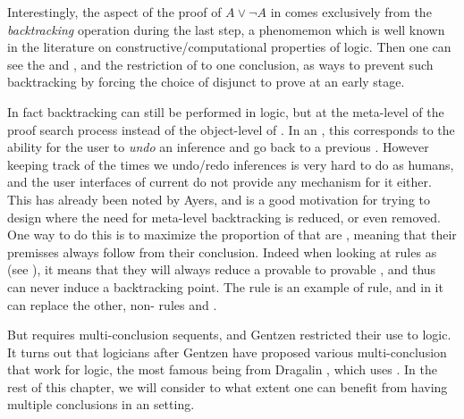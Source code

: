 Interestingly, the  aspect of the proof of $A \lor \neg A$ in
 comes exclusively from the \emph{backtracking} operation during
the last step, a phenomemon which is well known in the literature on
constructive/computational properties of  logic.
Then one can see the  {} and {},
and the restriction of   to one conclusion, as ways to
prevent such backtracking by forcing the choice of disjunct to prove at an early
stage.

In fact backtracking can still be performed in  logic, but at the
meta-level of the proof search process instead of the object-level of . In an , this corresponds to the ability for the
user to \emph{undo} an inference and go back to a previous . However
keeping track of the times we undo/redo inferences is very hard to do as humans,
and the user interfaces of current  do not provide any mechanism
for it either. This has already been noted by Ayers, and is a good motivation for trying to design
 where the need for meta-level backtracking is reduced, or even
removed. One way to do this is to maximize the proportion of 
that are \emph{}, meaning that their premisses always follow from
their conclusion. Indeed when looking at rules as  (see ),
it means that they will always reduce a provable  to provable , and
thus can never induce a backtracking point. The {} rule is an example of
 rule, and in  it can replace the other, non- rules
{} and {}.

But {} requires multi-conclusion sequents, and Gentzen restricted
their use to  logic. It turns out that logicians after Gentzen have
proposed various multi-conclusion  that work for 
logic, the most famous being  from Dragalin
, which uses {}. In the rest of
this chapter, we will consider to what extent one can benefit from having
multiple conclusions in an  setting.

